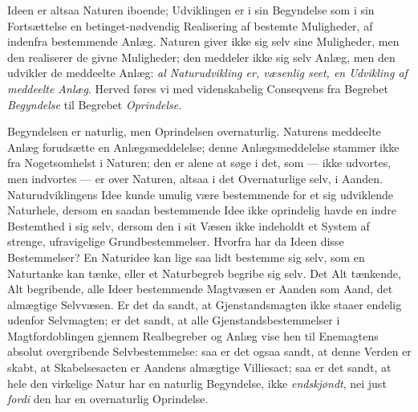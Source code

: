 \documentclass[12pt,a4paper]{book}
\begin{document}
Ideen er altsaa Naturen iboende; Udviklingen er i sin Begyndelse som i sin
Fortsættelse en betinget-nødvendig
Realisering af bestemte Muligheder, af indenfra bestemmende Anlæg. Naturen
giver ikke sig selv sine Muligheder, men den realiserer de givne Muligheder;
den meddeler ikke sig selv Anlæg, men den udvikler de meddeelte Anlæg:
\emph{al Naturudvikling er, væsenlig seet, en Udvikling af meddeelte Anlæg}.
Herved føres vi med videnskabelig Conseqvens fra Begrebet \emph{Begyndelse} til
Begrebet \emph{Oprindelse}.

Begyndelsen er naturlig, men Oprindelsen overnaturlig. Naturens meddeelte Anlæg
forudsætte en Anlægsmeddelelse; denne Anlægsmeddelelse stammer ikke fra
Nogetsomhelst i Naturen; den er alene at søge i det, som --- ikke udvortes, men
indvortes --- er over Naturen, altsaa i det Overnaturlige selv, i Aanden.
Naturudviklingens Idee kunde umulig være bestemmende for et sig udviklende
Naturhele, dersom en saadan bestemmende Idee ikke oprindelig havde en indre
Bestemthed i sig selv, dersom den i sit Væsen ikke indeholdt et System af
strenge, ufravigelige Grundbestemmelser. Hvorfra har da Ideen disse
Bestemmelser? En Naturidee kan lige saa lidt bestemme sig selv, som en
Naturtanke kan tænke, eller et Naturbegreb begribe sig selv. Det Alt tænkende,
Alt begribende, alle Ideer bestemmende Magtvæsen er Aanden som Aand, det
almægtige Selvvæsen. Er det da sandt, at Gjenstandsmagten ikke staaer endelig
udenfor Selvmagten; er det sandt, at alle Gjenstandsbestemmelser i
Magtfordoblingen gjennem Realbegreber og Anlæg vise hen til Enemagtens absolut
overgribende Selvbestemmelse: saa er det ogsaa sandt, at denne Verden er skabt,
at Skabelsesacten er Aandens almægtige Villiesact; saa er det sandt, at hele
den virkelige Natur har en naturlig Begyndelse, ikke \emph{endskjøndt}, nei
just \emph{fordi} den har en overnaturlig Oprindelse.
\end{document}
